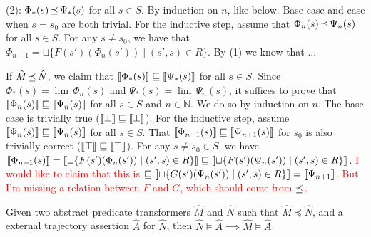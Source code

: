 (2): $\Phi_{*}(s) \operatorname{\preceq} \Psi_{*}(s)$ for all $s \in S$. By induction on $n$, like below. Base case and case when $s = s_{0}$ are both trivial. For the inductive step, assume that $\Phi_{n}(s) \operatorname{\preceq} \Psi_{n}(s)$ for all $s \in S$. For any $s \neq s_{0}$, we have that $\Phi_{n+1} = \sqcup \{ F(s')(\Phi_{n}(s')) \mid (s',s) \in R \}$. By (1) we know that ...

If $\hat M \operatorname{\preceq} \hat N$, we claim that $\llbracket\Phi_{*}(s)\rrbracket \sqsubseteq \llbracket\Psi_{*}(s)\rrbracket$ for all $s \in S$. Since $\Phi_{*}(s) = \lim \, \Phi_{n}(s)$ and $\Psi_{*}(s) = \lim \, \Psi_{n}(s)$, it suffices to prove that $\llbracket\Phi_{n}(s)\rrbracket \sqsubseteq \llbracket\Psi_{n}(s)\rrbracket$ for all $s \in S$ and $n \in \mathbb{N}$. We do so by induction on $n$. The base case is trivially true ($\llbracket\bot\rrbracket \sqsubseteq \llbracket\bot\rrbracket$). For the inductive step, assume $\llbracket\Phi_{n}(s)\rrbracket \sqsubseteq \llbracket\Psi_{n}(s)\rrbracket$ for all $s \in S$. That $\llbracket\Phi_{n+1}(s)\rrbracket \sqsubseteq \llbracket\Psi_{n+1}(s)\rrbracket$ for $s_{0}$ is also trivially correct ($\llbracket\top\rrbracket \sqsubseteq \llbracket\top\rrbracket$). For any $s \neq s_{0} \in S$, we have $\llbracket\Phi_{n+1}(s)\rrbracket = \llbracket\sqcup \{ F(s')(\Phi_{n}(s')) \mid (s',s) \in R \}\rrbracket \sqsubseteq \llbracket\sqcup \{ F(s')(\Psi_{n}(s')) \mid (s',s) \in R \}\rrbracket$. \textcolor{red}{I would like to claim that this is $\sqsubseteq \llbracket\sqcup \{ G(s')(\Psi_{n}(s')) \mid (s',s) \in R \}\rrbracket = \llbracket\Psi_{n+1}\rrbracket$. But I'm missing a relation between $F$ and $G$, which should come from $\operatorname{\preceq}$.}

\begin{theorem}
Given two abstract predicate transformers $\hat M$ and $\hat N$ such that $\hat M \preceq \hat N$, and a external trajectory assertion $\hat A$ for $\hat N$, then $\hat N \models \hat A \implies \hat M \models \hat A$.
\end{theorem}

